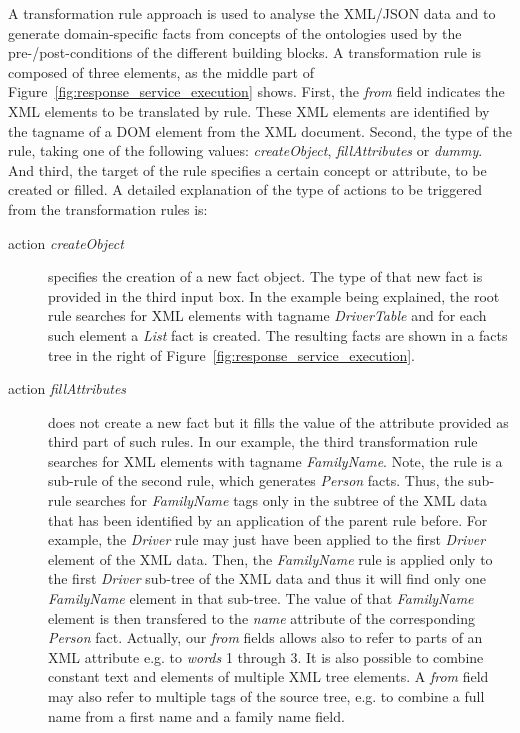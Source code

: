 \documentclass{fast_latex}
\begin{document}
A transformation rule approach is used to analyse the XML/JSON data and to generate domain-specific facts from concepts of the ontologies used by the pre-/post-conditions of the different building blocks. A transformation rule is composed of three elements, as the middle part of Figure~\ref{fig:response_service_execution} shows. First, the \textit{from} field indicates the XML elements to be translated by rule. These XML elements are identified by the tagname of a DOM element from the XML document. Second, the type of the rule, taking one of the following values: \emph{createObject}, \emph{fillAttributes} or \emph{dummy}. And third, the target of the rule specifies a certain concept or attribute, to be created or filled. A detailed explanation of the type of actions to be triggered from the transformation rules is:
\begin{description}
	\item[action \emph{createObject}] specifies the creation of a new fact object. The type of that new fact is provided in the third input box. In the example being explained, the root rule searches for XML elements with tagname \emph{DriverTable} and for each such element a \emph{List} fact is created. The resulting facts are shown in a facts tree in the right of Figure~\ref{fig:response_service_execution}.
	\item[action \emph{fillAttributes}] does not create a new fact but it fills the value of the attribute provided as third part of such rules. In our example, the third transformation rule searches for XML elements with tagname \emph{FamilyName}. Note, the rule is a sub-rule of the second rule, which generates \emph{Person} facts. Thus, the sub-rule searches for \emph{FamilyName} tags only in the subtree of the XML data that has been identified by an application of the parent rule before. For example, the \emph{Driver} rule may just have been applied to the first \emph{Driver} element of the XML data. Then, the \emph{FamilyName} rule is applied only to the first \emph{Driver} sub-tree of the XML data and thus it will find only one \emph{FamilyName} element in that sub-tree. The value of that \emph{FamilyName} element is then transfered to the \emph{name} attribute of the corresponding \emph{Person} fact. Actually, our \textit{from} fields allows also to refer to parts of an XML attribute e.g. to \textit{words} 1 through 3. It is also possible to combine constant text and elements of multiple XML tree elements. A \textit{from} field may also refer to multiple tags of the source tree, e.g. to combine a full name from a first name and a family name field.  

\end{description}
\end{document}
